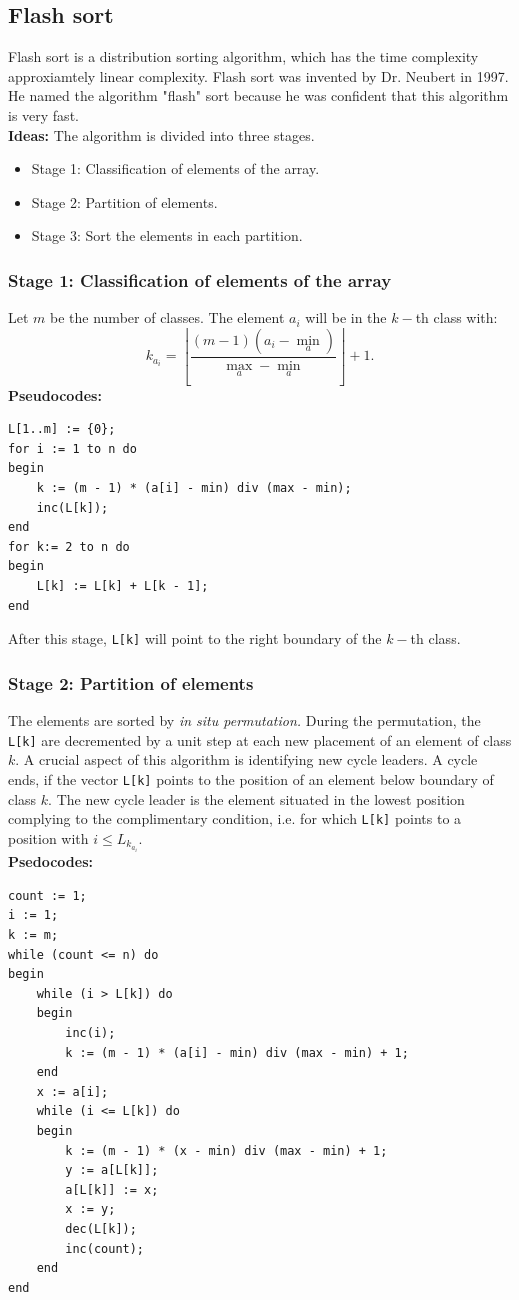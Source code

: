 \documentclass[12pt,a4paper]{article}
\begin{document}
\subsection{Flash sort}
Flash sort is a distribution sorting algorithm, which has the time complexity approxiamtely linear complexity. \cite{flash} Flash sort was invented by Dr. Neubert in 1997. He named the algorithm "flash" sort because he was confident that this algorithm is very fast.\\
\textbf{Ideas:} The algorithm is divided into three stages. \cite{thayP} \cite{flashsort}
\begin{itemize}
\item Stage 1: Classification of elements of the array. 
\item Stage 2: Partition of elements.
\item Stage 3: Sort the elements in each partition.
\end{itemize}
\subsubsection{Stage 1: Classification of elements of the array}
Let $m$ be the number of classes. The element $a_i$ will be in the $k-$th class with:
$${k_{{a_i}}} = \left\lfloor {\frac{{\left( {m - 1} \right)\left( {{a_i} - {{\min }_a}} \right)}}{{{{\max }_a} - {{\min }_a}}}} \right\rfloor + 1.$$
\textbf{Pseudocodes:} \cite{thayP}
\lstset{language=Pascal} 
\begin{lstlisting}[caption = {Flash sort - stage 1}]
L[1..m] := {0};
for i := 1 to n do
begin
	k := (m - 1) * (a[i] - min) div (max - min);
	inc(L[k]);
end
for k:= 2 to n do
begin
	L[k] := L[k] + L[k - 1];
end
\end{lstlisting}
After this stage, \lstinline{L[k]} will point to the right boundary of the $k-$th class.
\subsubsection{Stage 2: Partition of elements}
The elements are sorted by \textit{in situ permutation.} During the permutation, the \lstinline{L[k]} are decremented by a unit step at each new placement of an element of class $k.$ A crucial aspect of this algorithm is identifying new cycle leaders. A cycle ends, if the vector \lstinline{L[k]} points to the position of an element below boundary of class $k.$ The new cycle leader is the element situated in the lowest position complying to the complimentary condition, i.e. for which \lstinline{L[k]} points to a position with $i \leqslant {L_{{k_{{a_i}}}}}.$ \cite{flashsort}\\
\textbf{Psedocodes:} \cite{thayP}
\lstset{language=Pascal} 
\begin{lstlisting}[caption = {Flash sort - stage 2}]
count := 1;
i := 1;
k := m;
while (count <= n) do
begin
	while (i > L[k]) do
	begin
		inc(i);
		k := (m - 1) * (a[i] - min) div (max - min) + 1;
	end
	x := a[i];
	while (i <= L[k]) do
	begin
		k := (m - 1) * (x - min) div (max - min) + 1;
		y := a[L[k]];
		a[L[k]] := x;
		x := y;
		dec(L[k]);
		inc(count);
	end
end
\end{lstlisting}
\end{document}

